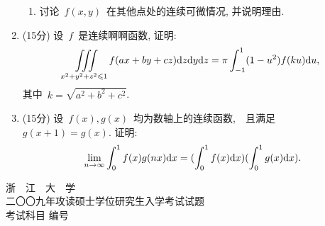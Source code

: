 \documentclass[UTF8,a4paper,11pt]{article}
\begin{document}
\begin{enumerate}
\begin{enumerate}
		      \item 讨论~$f(x,y)$~在其他点处的连续可微情况, 并说明理由.
	      \end{enumerate}
	      \vspace{2em}
	\item (15分) 设~$f$~是连续啊啊函数, 证明:
	      \[\iiint\limits_{x^2+y^2+z^2\leqslant 1} f(ax+by+cz)\mathrm{d}z\mathrm{d}y\mathrm{d}z=\pi\int_{-1}^{1}(1-u^2)f(ku)\mathrm{d}u,\]
	      其中~$k=\sqrt{a^2+b^2+c^2}$.
	      \vspace{2em}
	\item (15分) 设~$f(x),g(x)$~均为数轴上的连续函数,　且满足~$g(x+1)=g(x)$. 证明:
	      \[\lim_{n\to\infty}\int_0^1 f(x)g(nx)\mathrm{d}x=(\int_0^1 f(x)\mathrm{d}x)(\int_0^1 g(x)\mathrm{d}x).\]
	      \vspace{2em}
\end{enumerate}

\newpage
\setcounter{page}{1}
\begin{center}
	{\Huge 浙~~江~~大~~学}\\
	\setlength{\parskip}{5pt}
	{\Large 二〇〇九年攻读硕士学位研究生入学考试试题}\\
	\setlength{\parskip}{10 pt}
	{\Large 考试科目\underline{} 编号\underline{}}
\end{center}
\end{document}

